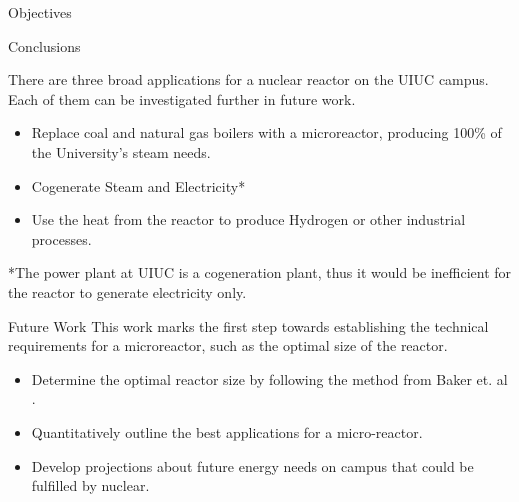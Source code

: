 \documentclass[final]{beamer}
\newlength{\onecolwid}
\newlength{\threecolwid}
\begin{document}
\begin{frame}[t]
\begin{columns}[t,totalwidth=\threecolwid]
\begin{column}{\onecolwid}
\begin{alertblock}{Objectives}
\end{alertblock}


\begin{block}{Conclusions}

There are three broad applications for a nuclear reactor on the UIUC campus. 
Each of them can be investigated further in future work.

\begin{itemize}
	\item Replace coal and natural gas boilers with a microreactor, producing 100\% 
	of the University's steam needs. 
	\item Cogenerate Steam and Electricity* 
	\item Use the heat from the reactor to produce Hydrogen or other industrial processes.
\end{itemize}

\small{*The power plant at UIUC is a cogeneration plant, thus it would be inefficient for 
the reactor to generate electricity only.}
\end{block}

\begin{alertblock}{Future Work }
This work marks the first step towards establishing the technical requirements for a microreactor, 
such as the optimal size of the reactor. 
\begin{itemize}
	\item Determine the optimal reactor size by following the method from Baker et. al \cite{baker_optimal_2018}.
	\item Quantitatively outline the best applications for a micro-reactor.
	\item Develop projections about future energy needs on campus that could be fulfilled by nuclear.
\end{itemize}


\end{alertblock}




\end{column}
\end{columns}
\end{frame}
\end{document}
